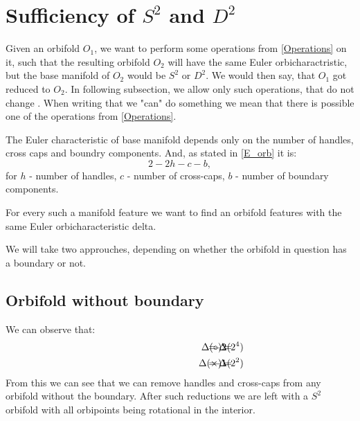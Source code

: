 \section{Sufficiency of $S^2$ and $D^2$}\label{sufficiency of D2 and S2}

Given an orbifold $O_1$, we want to perform some operations from \ref{Operations} on it, 
such that the resulting orbifold 
$O_2$ will have the same Euler orbicharactristic, but the base manifold of $O_2$ would 
be $S^2$ or $D^2$. We would then say, that $O_1$ got reduced to $O_2$.
In following subsection, we allow only such operations, that do not 
change \Eoc. When writing that we "can" do something we mean that there is 
possible one of the operations from \ref{Operations}.  %

The Euler characteristic of base manifold depends only on the number of handles, cross caps 
and boundry components. And, as stated in \ref{E_orb} it is: 
\begin{equation}
2-2h-c-b,
\end{equation}
for $h$ - number of handles, $c$ - number of cross-caps, $b$ - number of boundary components. 

For every such a manifold feature we want to find an orbifold features with the same 
Euler orbicharacteristic delta. 

We will take two approuches, depending on whether the orbifold in question has a boundary or not.

\subsection{Orbifold without boundary}
We can observe that:
\begin{align}
\hspace{3cm}\Delta(\circ) =& \hspace{-1cm} &-2& \hspace{-1cm} &= \Delta(2^4) \\
\hspace{3cm}\Delta(\times) =& \hspace{-1cm} &-1& \hspace{-1cm} &= \Delta(2^2)
\end{align}
From this we can see that we can remove handles and cross-caps from any orbifold without 
the boundary. 
After such reductions we are left with a $S^2$ orbifold with all orbipoints being rotational 
in the interior.

